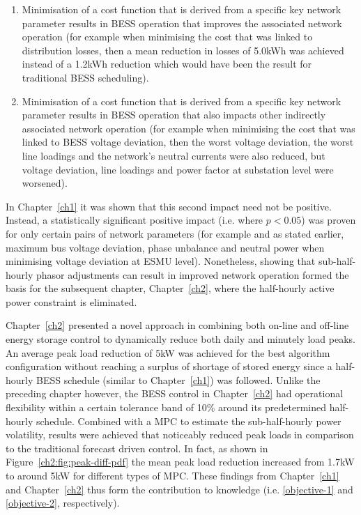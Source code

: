 \begin{enumerate}
	\item Minimisation of a cost function that is derived from a specific key network parameter results in BESS operation that improves the associated network operation (for example when minimising the cost that was linked to distribution losses, then a mean reduction in losses of 5.0kWh was achieved instead of a 1.2kWh reduction which would have been the result for traditional BESS scheduling).
	\item Minimisation of a cost function that is derived from a specific key network parameter results in BESS operation that also impacts other indirectly associated network operation (for example when minimising the cost that was linked to BESS voltage deviation, then the worst voltage deviation, the worst line loadings and the network's neutral currents were also reduced, but voltage deviation, line loadings and power factor at substation level were worsened).
\end{enumerate}

In Chapter~\ref{ch1} it was shown that this second impact need not be positive.
Instead, a statistically significant positive impact (i.e. where $p<0.05$) was proven for only certain pairs of network parameters (for example and as stated earlier, maximum bus voltage deviation, phase unbalance and neutral power when minimising voltage deviation at ESMU level).
Nonetheless, showing that sub-half-hourly phasor adjustments can result in improved network operation formed the basis for the subsequent chapter, Chapter~\ref{ch2}, where the half-hourly active power constraint is eliminated.

Chapter~\ref{ch2} presented a novel approach in combining both on-line and off-line energy storage control to dynamically reduce both daily and minutely load peaks.
An average peak load reduction of 5kW was achieved for the best algorithm configuration without reaching a surplus of shortage of stored energy since a half-hourly BESS schedule (similar to Chapter~\ref{ch1}) was followed.
Unlike the preceding chapter however, the BESS control in Chapter~\ref{ch2} had operational flexibility within a certain tolerance band of 10\% around its predetermined half-hourly schedule.
Combined with a MPC to estimate the sub-half-hourly power volatility, results were achieved that noticeably reduced peak loads in comparison to the traditional forecast driven control.
In fact, as shown in Figure~\ref{ch2:fig:peak-diff-pdf} the mean peak load reduction increased from 1.7kW to around 5kW for different types of MPC.
These findings from Chapter~\ref{ch1} and Chapter~\ref{ch2} thus form the contribution to knowledge (i.e. \ref{objective-1} and \ref{objective-2}, respectively).

